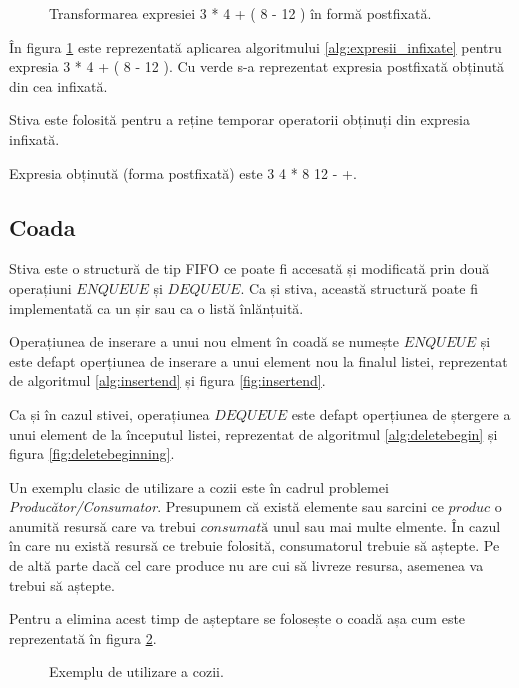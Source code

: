 \begin{figure}[H] 
	\centering	
	{
	}
	\caption{Transformarea expresiei  3 * 4 + ( 8 - 12 ) în formă postfixată.} 
	\label{fig:stackinfix}
\end{figure}

În figura \ref{fig:stackinfix} este reprezentată aplicarea algoritmului \ref{alg:expresii_infixate} pentru expresia 3 * 4 + ( 8 - 12 ).
Cu verde s-a reprezentat expresia postfixată obținută din cea infixată.

Stiva este folosită pentru a reține temporar operatorii obținuți din expresia infixată.

Expresia obținută (forma postfixată) este 3 4 * 8 12 - +.

\subsection{Coada}


Stiva este o structură de tip FIFO ce poate fi accesată și modificată prin două operațiuni $ENQUEUE$ și $DEQUEUE$. Ca și stiva, această structură poate fi implementată ca un șir sau ca o listă înlănțuită. 

Operațiunea de inserare a unui nou elment în coadă se numește  $ENQUEUE$ și este defapt operțiunea de inserare a unui element nou la finalul listei, reprezentat de algoritmul \ref{alg:insertend} și figura \ref{fig:insertend}.

Ca și în cazul stivei, operațiunea $DEQUEUE$ este defapt operțiunea de ștergere a unui element de la începutul listei, reprezentat de algoritmul \ref{alg:deletebegin} și figura \ref{fig:deletebeginning}.

Un exemplu clasic de utilizare a cozii este în cadrul problemei \textit{Producător/Consumator}. Presupunem că există elemente sau sarcini ce $produc$ o anumită resursă care va trebui $consumată$ unul sau mai multe elmente. În cazul în care nu există resursă ce trebuie folosită, consumatorul trebuie să aștepte. Pe de altă parte dacă cel care produce nu are cui să livreze resursa, asemenea va trebui să aștepte. 

Pentru a elimina acest timp de așteptare se folosește o coadă așa cum este reprezentată în figura \ref{fig:queue}.

\begin{figure}[H] 
	\centering	
	{
	}
	\caption{Exemplu de utilizare a cozii.} 
	\label{fig:queue}
\end{figure}

